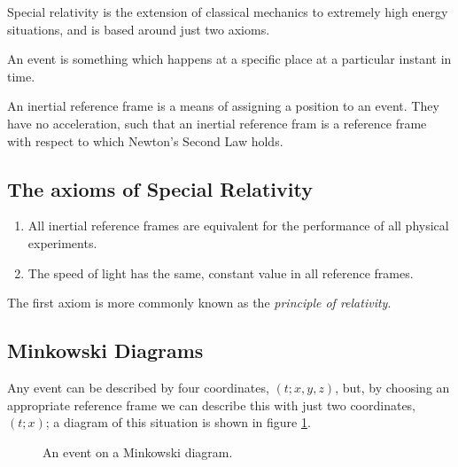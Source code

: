 
Special relativity is the extension of classical mechanics to
extremely high energy situations, and is based around just two axioms.

\begin{definition}[Event]
  An event is something which happens at a specific place at a
  particular instant in time.
\end{definition}

\begin{definition}
  An inertial reference frame is a means of assigning a position to an
  event. They have no acceleration, such that an inertial reference
  fram is a reference frame with respect to which Newton's Second Law
  holds.
\end{definition}

\subsection{The axioms of Special Relativity}
\label{sec:sraxiom}

\begin{enumerate}
\item All inertial reference frames are equivalent for the performance of all physical experiments.
\item The speed of light has the same, constant value in all reference frames.
\end{enumerate}
The first axiom is more commonly known as the \emph{principle of relativity}.

\subsection{Minkowski Diagrams}
\label{sec:minkdiag}

Any event can be described by four coordinates, $(t;x,y,z)$, but, by
choosing an appropriate reference frame we can describe this with just
two coordinates, $(t;x)$; a diagram of this situation is shown in
figure \ref{fig:minksimple}.

\begin{figure}
\centering
{}
\caption{An event on a Minkowski diagram.}
\label{fig:minksimple}
\end{figure}

